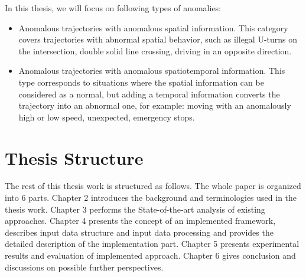 In this thesis, we will focus on following types of anomalies:
\begin{itemize}
	\item Anomalous trajectories with anomalous spatial information. This category covers trajectories with abnormal spatial behavior, such as illegal U-turns on the intersection, double solid line crossing, driving in an opposite direction.
	\item Anomalous trajectories with anomalous spatiotemporal information. This type corresponds to situations where the spatial information can be considered as a normal, but adding a temporal information converts the trajectory into an abnormal one, for example: moving with an anomalously high or low speed, unexpected, emergency stops.
\end{itemize}

\section{Thesis Structure}

The rest of this thesis work is structured as follows. The whole paper is organized into 6 parts. Chapter 2 introduces the background and terminologies used in the thesis work. Chapter 3 performs the State-of-the-art analysis of existing approaches. Chapter 4 presents the concept of an implemented framework, describes input data structure and input data processing and provides the detailed description of the implementation part. Chapter 5 presents experimental results and evaluation of implemented approach. Chapter 6 gives conclusion and discussions on possible further perspectives.